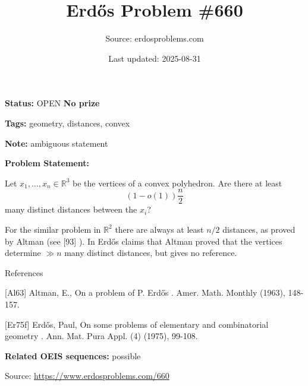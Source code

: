 \documentclass{article}
\title{Erd\H{o}s Problem \#660}
\date{Last updated: 2025-08-31}
\author{Source: erdosproblems.com}
\begin{document}
\maketitle

\noindent\textbf{Status:} OPEN \quad \textbf{No prize}

\noindent\textbf{Tags:} geometry, distances, convex

\medskip
\noindent\textbf{Note:} ambiguous statement

\medskip

\noindent\textbf{Problem Statement:}

Let $x_1,\ldots,x_n\in \mathbb{R}^3$ be the vertices of a convex polyhedron. Are there at least\[(1-o(1))\frac{n}{2}\]many distinct distances between the $x_i$?




For the similar problem in $\mathbb{R}^2$ there are always at least $n/2$ distances, as proved by Altman \cite{Al63} (see [93] ). In \cite{Er75f} Erd\H{o}s claims that Altman proved that the vertices determine $\gg n$ many distinct distances, but gives no reference.




References

[Al63] Altman, E., On a problem of P. Erd\H{o}s . Amer. Math. Monthly (1963), 148-157.

[Er75f] Erd\H{o}s, Paul, On some problems of elementary and combinatorial geometry . Ann. Mat. Pura Appl. (4) (1975), 99-108.

\noindent\textbf{Related OEIS sequences:} possible


\bigskip
\noindent\small{Source: \url{https://www.erdosproblems.com/660}}
\end{document}
